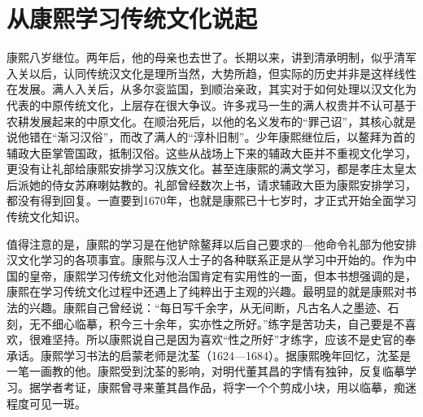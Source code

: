 \begin{sectionnotes}







\end{sectionnotes}
\section{从康熙学习传统文化说起}


康熙八岁继位。两年后，他的母亲也去世了。长期以来，讲到清承明制，似乎清军入关以后，认同传统汉文化是理所当然，大势所趋，但实际的历史并非是这样线性在发展。满人入关后，从多尔衮监国，到顺治亲政，其实对于如何处理以汉文化为代表的中原传统文化，上层存在很大争议。许多戎马一生的满人权贵并不认可基于农耕发展起来的中原文化。在顺治死后，以他的名义发布的“罪己诏”，其核心就是说他错在“渐习汉俗”，而改了满人的“淳朴旧制”。少年康熙继位后，以鳌拜为首的辅政大臣掌管国政，抵制汉俗。这些从战场上下来的辅政大臣并不重视文化学习，更没有让礼部给康熙安排学习汉族文化。甚至连康熙的满文学习，都是孝庄太皇太后派她的侍女苏麻喇姑教的。礼部曾经数次上书，请求辅政大臣为康熙安排学习，都没有得到回复。一直要到1670年，也就是康熙已十七岁时，才正式开始全面学习传统文化知识。



值得注意的是，康熙的学习是在他铲除鳌拜以后自己要求的—他命令礼部为他安排汉文化学习的各项事宜。康熙与汉人士子的各种联系正是从学习中开始的。作为中国的皇帝，康熙学习传统文化对他治国肯定有实用性的一面，但本书想强调的是，康熙在学习传统文化过程中还遇上了纯粹出于主观的兴趣。最明显的就是康熙对书法的兴趣。康熙自己曾经说：“每日写千余字，从无间断，凡古名人之墨迹、石刻，无不细心临摹，积今三十余年，实亦性之所好。”练字是苦功夫，自己要是不喜欢，很难坚持。所以康熙说自己是因为喜欢“性之所好”才练字，应该不是史官的奉承话。康熙学习书法的启蒙老师是沈荃（1624—1684）。据康熙晚年回忆，沈荃是一笔一画教的他。康熙受到沈荃的影响，对明代董其昌的字情有独钟，反复临摹学习。据学者考证，康熙曾寻来董其昌作品，将字一个个剪成小块，用以临摹，痴迷程度可见一斑。


